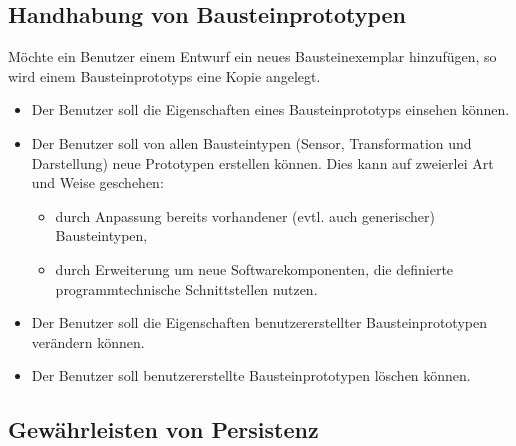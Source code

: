 \documentclass[parskip=full]{scrartcl}
\begin{document}
\subsection{Handhabung von Bausteinprototypen}

Möchte ein Benutzer einem Entwurf ein neues Bausteinexemplar hinzufügen, so wird einem \glspl{Bausteinprototyp} eine Kopie angelegt.

\begin{itemize}
	
	\item 
	\begin{SollKrit} 
		Der Benutzer soll die Eigenschaften eines Bausteinprototyps einsehen können.
	\end{SollKrit}
	
	\item Der Benutzer soll von allen Bausteintypen (Sensor, Transformation und Darstellung) neue Prototypen erstellen können. Dies kann auf zweierlei Art und Weise geschehen: 
	
	\begin{itemize}
		
		\item 
		\begin{SollKrit} 
			durch Anpassung bereits vorhandener (evtl. auch generischer) Bausteintypen,
		\end{SollKrit}
		
		\item 
		\begin{WunschKrit} 
			durch Erweiterung um neue Softwarekomponenten, die definierte programmtechnische Schnittstellen nutzen.
		\end{WunschKrit}
		
	\end{itemize}
	
	\item 
	\begin{SollKrit}
		Der Benutzer soll die Eigenschaften benutzererstellter Bausteinprototypen verändern können.
	\end{SollKrit}
	
	\item 
	\begin{SollKrit}
		Der Benutzer soll benutzererstellte Bausteinprototypen löschen können.
	\end{SollKrit}
	
	
\end{itemize}

\subsection{Gewährleisten von Persistenz}
\end{document}
